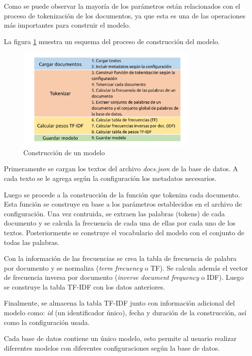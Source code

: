 Como se puede observar la mayoría de los parámetros están relacionados
con el proceso de tokenización de los documentos, ya que esta es una de las
operaciones más importantes para construir el modelo.

La figura \ref{fig:model-build} muestra un esquema del proceso de construcción del
modelo.

\begin{figure}[htb]%
	\begin{center}
		\includegraphics[width=0.8\textwidth]{./sri_02.png}
	\end{center}
	\caption{Construcción de un modelo}
	\label{fig:model-build}
\end{figure}

Primeramente se cargan los textos del archivo \emph{docs.json} de la base de
datos. A cada texto se le agrega según la configuración los metadatos necesarios.

Luego se procede a la construcción de la función que tokeniza cada documento.
Esta función se construye en base a los parámetros establecidos en el archivo
de configuración. Una vez contruida, se extraen las palabras (tokens) de
cada documento y se calcula la frecuencia de cada una de ellas por cada uno de
los textos. Posteriormente se construye el vocabulario del modelo con el
conjunto de todas las palabras.

Con la información de las frecuencias se crea la tabla de frecuencia de palabra
por documento y se normaliza (\emph{term frecuency} o TF). Se calcula además el
vector de frecuencia inversa por documento (\emph{inverse document frequency} o
IDF). Luego se construye la tabla TF-IDF con los datos anteriores.

Finalmente, se almacena la tabla TF-IDF junto con información adicional del modelo
como: \emph{id} (un identificador único), fecha y duración de la construcción, así
como la configuración usada.

Cada base de datos contiene un único modelo, esto permite al usuario realizar
diferentes modelos con diferentes configuraciones según la base de datos.

